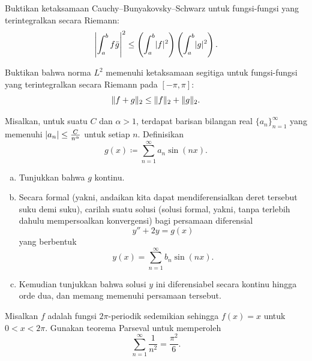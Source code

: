 \begin{exercise} \label{exercise:L2cauchyschwarz}
Buktikan ketaksamaan Cauchy--Bunyakovsky--Schwarz
untuk fungsi-fungsi yang terintegralkan secara Riemann:
\begin{equation*}
{\left\lvert {\int_a^b f\bar{g}} \right\rvert}^2
\leq
\left( \int_a^b \lvert {f} \rvert^2 \right)
\left( \int_a^b \lvert {g} \rvert^2 \right) .
\end{equation*}
\end{exercise}

\begin{exercise} \label{exercise:L2triangleineq}
Buktikan bahwa norma $L^2$ memenuhi ketaksamaan segitiga
untuk fungsi-fungsi yang terintegralkan secara Riemann pada $[-\pi,\pi]$:
\begin{equation*}
\lVert {f+g} \rVert_2 \leq \lVert {f} \rVert_2 + \lVert {g} \rVert_2 .
\end{equation*}
\end{exercise}

\begin{exercise}
\pagebreak[3]
Misalkan, untuk suatu $C$ dan $\alpha > 1$, terdapat
barisan bilangan real $\{ a_n \}_{n=1}^\infty$ yang memenuhi
$\lvert {a_n} \rvert \leq \frac{C}{n^\alpha}$ untuk setiap $n$.
Definisikan
\begin{equation*}
g(x) \coloneqq \sum_{n=1}^\infty a_n \sin(n x) .
\end{equation*}
\begin{enumerate}[a)]
\item
Tunjukkan bahwa $g$ kontinu.
\item
Secara formal (yakni, andaikan kita dapat mendiferensialkan deret tersebut suku demi suku),
carilah suatu solusi (solusi formal, yakni, tanpa terlebih dahulu mempersoalkan konvergensi)
bagi persamaan diferensial
\begin{equation*}
y''+ 2 y = g(x)
\end{equation*}
yang berbentuk
\begin{equation*}
y(x) = \sum_{n=1}^\infty b_n \sin(n x) .
\end{equation*}
\item
Kemudian tunjukkan bahwa solusi $y$ ini diferensiabel secara kontinu hingga orde dua,
dan memang memenuhi persamaan tersebut.
\end{enumerate}
\end{exercise}

\begin{exercise}
Misalkan $f$ adalah fungsi $2\pi$-periodik sedemikian sehingga
$f(x) = x$ untuk $0 < x < 2\pi$.
Gunakan teorema Parseval untuk memperoleh
\begin{equation*}
\sum_{n=1}^\infty \frac{1}{n^2} = \frac{\pi^2}{6} .
\end{equation*}
\end{exercise}

